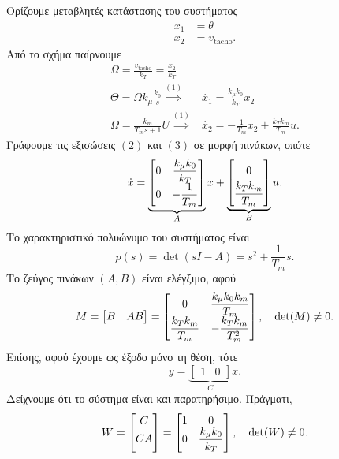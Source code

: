 \documentclass[12pt]{article}
\begin{document}
Ορίζουμε μεταβλητές κατάστασης του συστήματος
\begin{align*}
        x_1 &= \theta \\
        x_2 &= v_{\textrm{tacho}}.
\end{align*}
Από το σχήμα παίρνουμε
\begin{align}
        \Omega = \frac{v_\textrm{tacho}}{k_T} = \frac{x_2}{k_T} \\
        \Theta = \Omega k_\mu \frac{k_0}{s} \overset{(1)}{\implies}&\dot{x_1} = \frac{k_\mu k_0}{k_T}x_2  \\
        \Omega = \frac{k_m}{T_ms + 1}U \overset{(1)}{\implies}& \dot{x_2} = -\frac{1}{T_m}x_2 + \frac{k_Tk_m }{T_m }u.
\end{align}
Γράφουμε τις εξισώσεις \((2)\) και \((3)\) σε μορφή πινάκων, οπότε 
\[
\dot{x} = \underbrace{\begin{bmatrix}
        0 & \dfrac{k_\mu k_0}{k_T } \\
        0 & -\dfrac{1}{T_m} 
\end{bmatrix}}_{A} x + \underbrace{\begin{bmatrix}
        0\vphantom{\dfrac{0}{1}} \\
        \dfrac{k_T k_m }{T_m }   
\end{bmatrix}}_{B} u.
\] 
Το χαρακτηριστικό πολυώνυμο του συστήματος είναι
\begin{equation*}
    p(s) = \det(sI - A) = s^2 + \dfrac{1}{T_m } s. 
\end{equation*}
Το ζεύγος πινάκων \((A,B)\) είναι ελέγξιμο, αφού 
\[
    M = \begin{bmatrix}
        B & AB
    \end{bmatrix} = \begin{bmatrix}
        0\vphantom{\dfrac{0}{1}} & \dfrac{k_\mu k_0 k_m }{T_m }\\
        \dfrac{k_T k_m }{T_m } & -\dfrac{k_T k_m }{T_m^2}   
    \end{bmatrix}, \quad \det(M) \neq 0.
\]
Επίσης, αφού έχουμε ως έξοδο μόνο τη θέση, τότε
\[
    y = \underbrace{\begin{bmatrix}
        1 & 0
    \end{bmatrix}}_{C} x. 
\] 
Δείχνουμε ότι το σύστημα είναι και παρατηρήσιμο. Πράγματι, 
\[
    W = \begin{bmatrix}
        C \\
        CA\vphantom{\dfrac{0}{1_1}}
    \end{bmatrix} = \begin{bmatrix}
        1 & 0 \\
        0 & \dfrac{k_\mu k_0}{k_T}
    \end{bmatrix}, \quad \det(W) \neq 0.
\]
\end{document}
